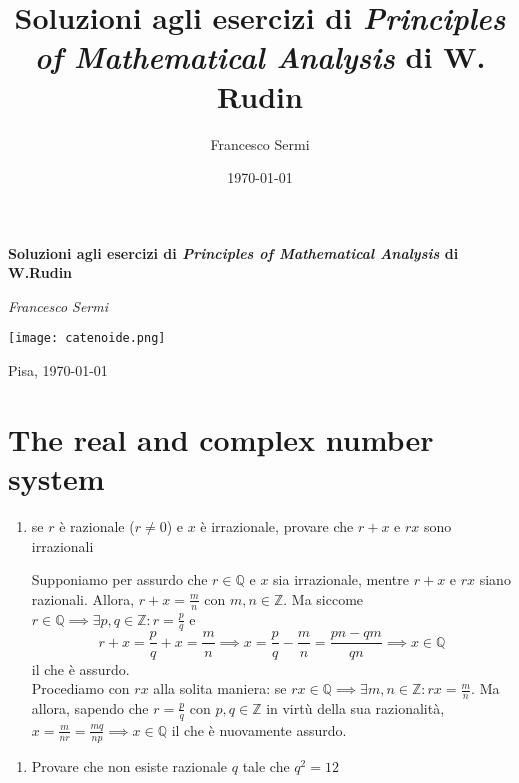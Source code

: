 \documentclass{report}
\title{Soluzioni agli esercizi di \emph{Principles of Mathematical Analysis} di W. Rudin}
\author{Francesco Sermi}
\date{\today}
\begin{document}
	\begin{titlepage}
	\centering
	\vspace*{3cm}
	\begin{flushleft}
	
	{\huge\bfseries Soluzioni agli esercizi di \emph{Principles of Mathematical Analysis} di W.Rudin \par}
	\vspace{2cm}
	{\Large\itshape Francesco Sermi\par}
	\end{flushleft}
	\vfill
	\texttt{[image: catenoide.png]}
	\vfill
	{\large \hfill Pisa, \today \par}
\end{titlepage}
	\tableofcontents
	\chapter{The real and complex number system}
	\begin{enumerate}[label=\protect\circled{\arabic*}]
		\item se $r$ è razionale ($r \neq 0$) e $x$ è irrazionale, provare che $r+x$ e $rx$ sono irrazionali
		\begin{mysolution}
			Supponiamo per assurdo che $r \in \mathbb{Q}$ e $x$ sia irrazionale, mentre $r+x$ e $rx$ siano razionali. Allora, $r+x = \frac{m}{n}$ con $m, n \in \mathbb{Z}$. Ma siccome $r \in \mathbb{Q} \implies \exists p, q \in \mathbb{Z}: r = \frac{p}{q}$ e
			$$
				r + x = \frac{p}{q} + x = \frac{m}{n} \implies x = \frac{p}{q} - \frac{m}{n} = \frac{pn - qm}{qn} \implies x \in \mathbb{Q}
			$$ 
			il che è assurdo. \\
			Procediamo con $rx$ alla solita maniera: se $rx \in \mathbb{Q} \implies \exists m, n \in \mathbb{Z}: rx = \frac{m}{n}$.  Ma allora, sapendo che $r = \frac{p}{q}$ con $p, q \in \mathbb{Z}$ in virtù della sua razionalità, $x = \frac{m}{nr} = \frac{mq}{np} \implies x \in \mathbb{Q}$ il che è nuovamente assurdo.
		\end{mysolution}
\end{enumerate}
\begin{enumerate}[resume, label=\protect\circled{\arabic*}]
		\item Provare che non esiste razionale $q$ tale che $q^2 = 12$
\end{enumerate}
\end{document}
